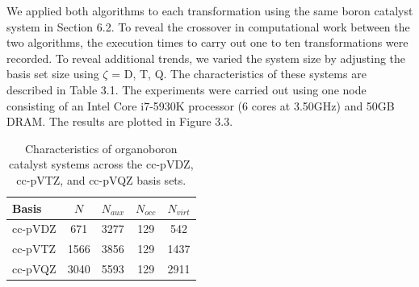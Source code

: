We applied both algorithms to each transformation using the
same boron catalyst system in Section 6.2. To reveal the crossover in computational work between the two algorithms, 
the execution times to carry out one to ten transformations were recorded. To reveal additional trends, we varied the
system size by adjusting the basis set size using $\zeta$ = D, T, Q. The characteristics of these systems are described in Table 3.1.
The experiments were carried out using one node consisting of an Intel Core i7-5930K processor
(6 cores at 3.50GHz) and 50GB DRAM. The results are plotted in Figure 3.3.
 
\begingroup
\begin{table}[H]
\centering
\renewcommand{\baselinestretch}{1}
\caption{Characteristics of organoboron catalyst systems across the cc-pVDZ, cc-pVTZ, and cc-pVQZ basis sets.}
\begin{tabular}{l cccc}
\multicolumn{1}{l}{\textbf{Basis}} &
\multicolumn{1}{c}{\textbf{$N$}} &
\multicolumn{1}{c}{\textbf{$N_{aux}$}} &
\multicolumn{1}{c}{\textbf{$N_{occ}$}} &
\multicolumn{1}{c}{\textbf{$N_{virt}$}} \\
\hline
cc-pVDZ   & 671  & 3277      & 129       & 542        \\ 
cc-pVTZ   & 1566 & 3856      & 129       & 1437       \\ 
cc-pVQZ   & 3040 & 5593      & 129       & 2911       \\ 
\end{tabular}
\end{table}
\endgroup


